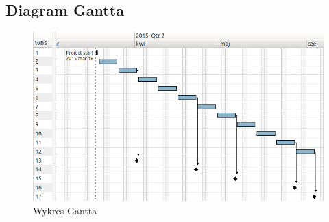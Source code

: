 \documentclass[a4paper]{article}
\begin{document}
\subsection{Diagram Gantta}
\begin{figure}[h] %
  \begin{center}  
    \includegraphics[width=\textwidth]{./rysunki/gantt.png} 
  \end{center}
  \caption{Wykres Gantta}
  \label{fig:gantt} 
\end{figure}       
\end{document}
